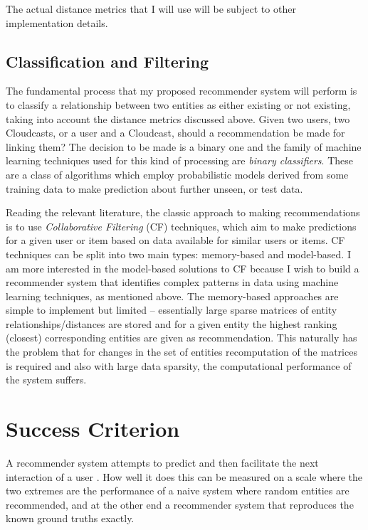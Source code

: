 The actual distance metrics that I will use will be subject to other implementation details. 

\subsection*{Classification and Filtering}

The fundamental process that my proposed recommender system will perform is to classify a relationship between two entities as either existing or not existing, taking into account the distance metrics discussed above. Given two users, two Cloudcasts, or a user and a Cloudcast, should a recommendation be made for linking them? The decision to be made is a binary one and the family of machine learning techniques used for this kind of processing are \emph{binary classifiers}. These are a class of algorithms which employ probabilistic models derived from some training data to make prediction about further unseen, or test data.

Reading the relevant literature, the classic approach to making recommendations is to use \emph{Collaborative Filtering} (CF) techniques, which aim to make predictions for a given user or item based on data available for similar users or items. CF techniques can be split into two main types: memory-based and model-based. I am more interested in the model-based solutions to CF because I wish to build a recommender system that identifies complex patterns in data using machine learning techniques, as mentioned above. The memory-based approaches are simple to implement but limited -- essentially large sparse matrices of entity relationships/distances are stored and for a given entity the highest ranking (closest) corresponding entities are given as recommendation. This naturally has the problem that for changes in the set of entities recomputation of the matrices is required and also with large data sparsity, the computational performance of the system suffers.

\section{Success Criterion}

A recommender system attempts to predict and then facilitate the next interaction of a user \cite{analysis_recsys_algs}. How well it does this can be measured on a scale where the two extremes are the performance of a naive system where random entities are recommended, and at the other end a recommender system that reproduces the known ground truths exactly. 


